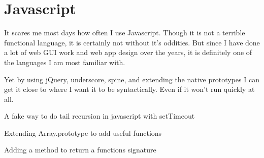 \section{Javascript}

It scares me most days how often I use Javascript.  Though it is not a terrible
functional language, it is certainly not without it's oddities.  But since I
have done a lot of web GUI work and web app design over the years, it is
definitely one of the languages I am most familiar with.

Yet by using jQuery, underscore, spine, and extending the native prototypes I
can get it close to where I want it to be syntactically.  Even if it won't run
quickly at all.


{A fake way to do tail recursion in javascript with setTimeout}

{Extending Array.prototype to add useful functions}

{Adding a method to return a functions signature}

